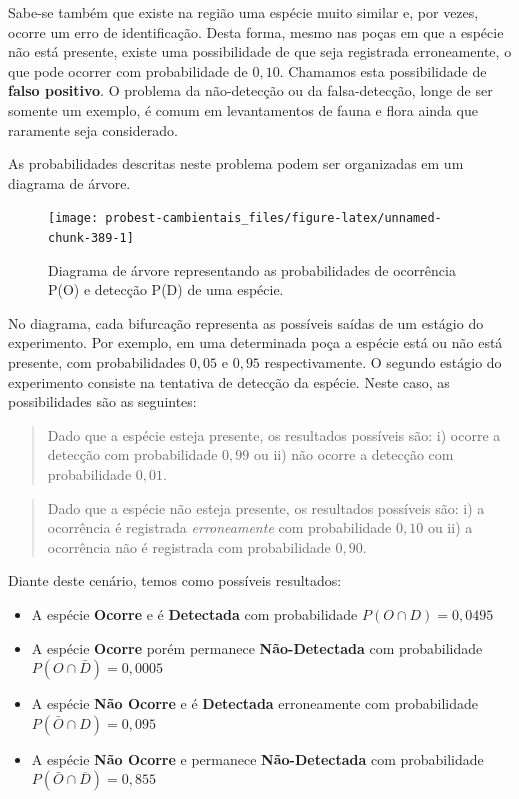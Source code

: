 \documentclass[
]{book}
\begin{document}
Sabe-se também que existe na região uma espécie muito similar e, por vezes, ocorre um erro de identificação. Desta forma, mesmo nas poças em que a espécie não está presente, existe uma possibilidade de que seja registrada erroneamente, o que pode ocorrer com probabilidade de \(0,10\). Chamamos esta possibilidade de \textbf{falso positivo}. O problema da não-detecção ou da falsa-detecção, longe de ser somente um exemplo, é comum em levantamentos de fauna e flora ainda que raramente seja considerado.

As probabilidades descritas neste problema podem ser organizadas em um diagrama de árvore.

\begin{figure}

{\centering \texttt{[image: probest-cambientais\_files/figure-latex/unnamed-chunk-389-1]} 

}

\caption{Diagrama de árvore representando as probabilidades de ocorrência P(O) e detecção P(D) de uma espécie.}\label{fig:unnamed-chunk-389}
\end{figure}

No diagrama, cada bifurcação representa as possíveis saídas de um estágio do experimento. Por exemplo, em uma determinada poça a espécie está ou não está presente, com probabilidades \(0,05\) e \(0,95\) respectivamente. O segundo estágio do experimento consiste na tentativa de detecção da espécie. Neste caso, as possibilidades são as seguintes:

\begin{quote}
Dado que a espécie esteja presente, os resultados possíveis são: i) ocorre a detecção com probabilidade \(0,99\) ou ii) não ocorre a detecção com probabilidade \(0,01\).
\end{quote}

\begin{quote}
Dado que a espécie não esteja presente, os resultados possíveis são: i) a ocorrência é registrada \emph{erroneamente} com probabilidade \(0,10\) ou ii) a ocorrência não é registrada com probabilidade \(0,90\).
\end{quote}

Diante deste cenário, temos como possíveis resultados:

\begin{itemize}
\item
  A espécie \textbf{Ocorre} e é \textbf{Detectada } com probabilidade \(P(O \cap D) = 0,0495\)
\item
  A espécie \textbf{Ocorre } porém permanece \textbf{Não-Detectada } com probabilidade \(P(O \cap \bar{D}) = 0,0005\)
\item
  A espécie \textbf{Não Ocorre } e é \textbf{Detectada } erroneamente com probabilidade \(P(\bar{O} \cap D) = 0,095\)
\item
  A espécie \textbf{Não Ocorre } e permanece \textbf{Não-Detectada } com probabilidade \(P(\bar{O} \cap\overline{D}) = 0,855\)
\end{itemize}
\end{document}

